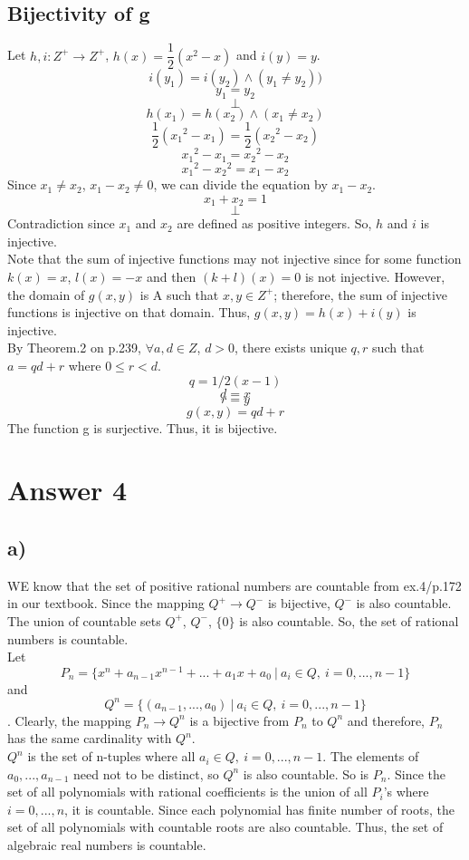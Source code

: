 \documentclass[12pt]{article}
\begin{document}
\subsection*{Bijectivity of g}
Let $h,i: Z^+\rightarrow Z^+$, $h(x)=\dfrac{1}{2}(x^2-x)$ and $i(y)=y$.\\
$$i(y_1)=i(y_2) \wedge (y_1\neq y_2))$$
$$y_1=y_2$$
$$\perp$$
$$h(x_1)=h(x_2) \wedge (x_1 \neq x_2)$$
$$\dfrac{1}{2}(x_1{^2}-x_1)=\dfrac{1}{2}(x_2{^2}-x_2)$$
$$x_1{^2}-x_1=x_2{^2}-x_2$$
$$x_1{^2}-x_2{^2}=x_1-x_2$$
Since $x_1 \neq x_2$, $x_1-x_2\neq 0$, we can divide the equation by $x_1-x_2$.
$$x_1+x_2=1$$
$$\perp$$
Contradiction since $x_1$ and $x_2$ are defined as positive integers. So, $h$ and $i$ is injective.\\

Note that the sum of injective functions may not injective since for some function $k(x)=x$, $l(x)=-x$ and then $(k+l)(x)=0$ is not injective. However, the domain of $g(x,y)$ is A such that $x,y\in Z^+$; therefore, the sum of injective functions is injective on that domain. Thus, $g(x,y)=h(x)+i(y)$ is injective.\\

By Theorem.2 on p.239, $\forall a,d \in Z$, $d>0$, there exists unique $q,r$ such that $a=qd+r$ where $0 \leq r <d$.
$$q=1/2(x-1)$$
$$d=x$$
$$r=y$$
$$g(x,y)=qd+r$$
The function g is surjective. Thus, it is bijective.

\section*{Answer 4}
\subsection*{a)} 
WE know that the set of positive rational numbers are countable from ex.4/p.172 in our textbook. Since the mapping $Q^{+} \rightarrow Q^{-}$ is bijective, $Q^-$ is also countable. The union of countable sets $Q^+$, $Q^-$, $\{ 0 \}$ is also countable. So, the set of rational numbers is countable.\\

Let 
$$P_n=\{x^n+a_{n-1}x^{n-1}+...+a_1x+a_0\ |\ a_i \in Q,\ i=0,...,n-1\}$$ and
$$Q^n=\{(a_{n-1},...,a_0)\ |\ a_i \in Q,\ i=0,...,n-1\}$$.
Clearly, the mapping $P_n \rightarrow Q^n$ is a bijective from $P_n $ to $Q^n$ and therefore, $P_n $ has the same cardinality with $Q^n$.\\

$Q^n$ is the set of n-tuples where all $a_i \in Q,\ i=0,...,n-1$. The elements of $a_0,...,a_{n-1}$ need not to be distinct, so $Q^n$ is also countable. So is $P_n$. Since the set of all polynomials with rational coefficients is the union of all $P_i$'s where $i=0,...,n$, it is countable. Since each polynomial has finite number of roots, the set of all polynomials with countable roots are also countable. Thus, the set of algebraic real numbers is countable.
\end{document}
